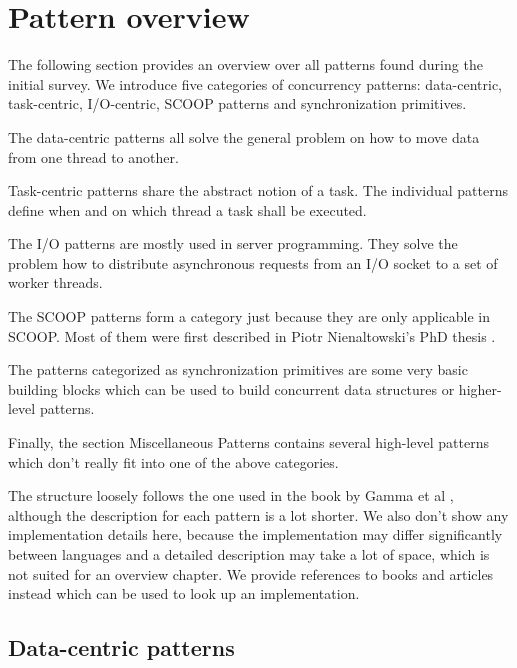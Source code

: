\section {Pattern overview}
\label{sec:pattern_overview}

The following section provides an overview over all patterns found during the initial survey.
We introduce five categories of concurrency patterns: data-centric, task-centric, I/O-centric, SCOOP patterns and synchronization primitives.

The data-centric patterns all solve the general problem on how to move data from one thread to another.

Task-centric patterns share the abstract notion of a task.
The individual patterns define when and on which thread a task shall be executed.

The I/O patterns are mostly used in server programming.
They solve the problem how to distribute asynchronous requests from an I/O socket to a set of worker threads.

The SCOOP patterns form a category just because they are only applicable in SCOOP.
Most of them were first described in Piotr Nienaltowski's PhD thesis  \cite{Nienaltowski07}.

The patterns categorized as synchronization primitives are some very basic building blocks which can be used to build concurrent data structures or higher-level patterns.

Finally, the section Miscellaneous Patterns contains several high-level patterns which don't really fit into one of the above categories.

The structure loosely follows the one used in the book by Gamma et al \cite{book:design-patterns}, although the description for each pattern is a lot shorter.
We also don't show any implementation details here, because the implementation may differ significantly between languages and a detailed description may take a lot of space, which is not suited for an overview chapter.
We provide references to books and articles instead which can be used to look up an implementation.


\subsection{Data-centric patterns}

